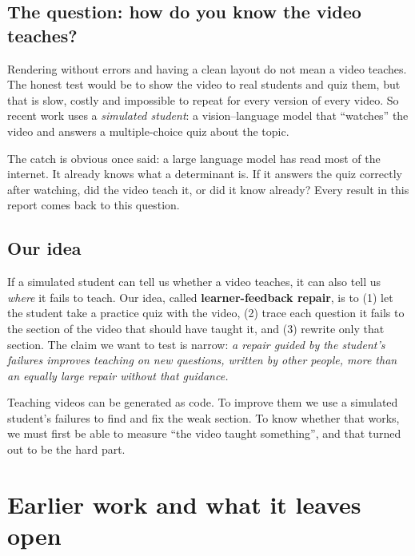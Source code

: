 \documentclass[11pt]{article}
\begin{document}
\subsection{The question: how do you know the video teaches?}

Rendering without errors and having a clean layout do not mean a video teaches. The honest test would be to show the
video to real students and quiz them, but that is slow, costly and impossible to repeat for every version of every
video. So recent work uses a \emph{simulated student}: a vision--language model that ``watches'' the video and
answers a multiple-choice quiz about the topic.

The catch is obvious once said: a large language model has read most of the internet. It already knows what a
determinant is. If it answers the quiz correctly after watching, did the video teach it, or did it know already?
Every result in this report comes back to this question.

\subsection{Our idea}

If a simulated student can tell us whether a video teaches, it can also tell us \emph{where} it fails to teach. Our
idea, called \textbf{learner-feedback repair}, is to (1) let the student take a practice quiz with the video, (2)
trace each question it fails to the section of the video that should have taught it, and (3) rewrite only that
section. The claim we want to test is narrow: \emph{a repair guided by the student's failures improves teaching on
new questions, written by other people, more than an equally large repair without that guidance.}

\begin{inshort}
Teaching videos can be generated as code. To improve them we use a simulated student's failures to find and fix the
weak section. To know whether that works, we must first be able to measure ``the video taught something'', and that
turned out to be the hard part.
\end{inshort}

\section{Earlier work and what it leaves open}
\end{document}
